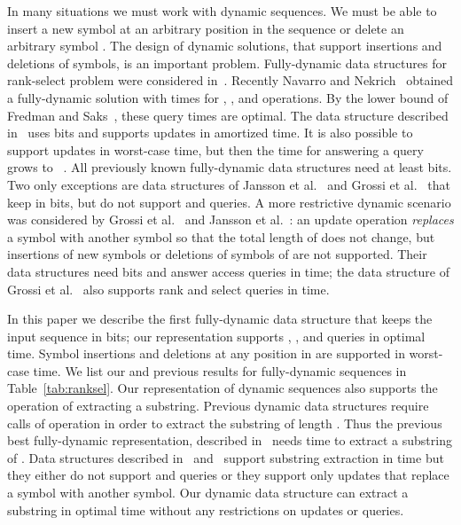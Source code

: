 \documentclass[11pt]{article}\usepackage{fullpage}
\begin{document}
In many situations we must work with dynamic sequences. We must be able to insert a new symbol at an arbitrary 
position  in the sequence or delete an arbitrary symbol .  The design of dynamic solutions, that support insertions and deletions of symbols, is an important problem.  Fully-dynamic data structures for rank-select problem were considered in~\cite{HSS03,CHL04,BB04,MN06,CHLS07,GHSV07,MN08,HSS11}. 
Recently Navarro and Nekrich~\cite{NavarroN13,NavarroN13a} obtained a fully-dynamic solution with  times for , , and  operations. By the lower bound of Fredman and Saks~\cite{FS89}, these query times are optimal.  The data structure described in~\cite{NavarroN13} uses  bits and supports updates in  amortized time. It is also possible to support updates in  worst-case time, but then the time for answering a  query grows to ~\cite{NavarroN13a}. All previously known fully-dynamic data structures need at least  bits. Two only exceptions are data structures of Jansson et al.~\cite{JanssonSS12} and Grossi et al.~\cite{GrossiRRV13} that keep  in  bits, but do not support  and  queries. 
A more restrictive dynamic scenario was considered by Grossi et al.~\cite{GrossiRRV13} and Jansson et al.~\cite{JanssonSS12}: an update operation \emph{replaces} a symbol  with another symbol so that the total length of  does not change, but insertions of new symbols or deletions of symbols of  are not supported.  Their data structures need  bits and answer access queries in  time; the data structure of Grossi et al.~\cite{GrossiRRV13} also supports rank and select queries in  time.

In this paper we describe the first fully-dynamic data structure 
that keeps the input sequence in  bits; our representation supports , , and  queries 
in optimal  time. 
Symbol insertions and deletions at any position in  are supported in  worst-case time.
We list our and previous results for fully-dynamic sequences in Table~\ref{tab:ranksel}. 
Our representation of dynamic sequences also supports the operation of extracting a substring. Previous dynamic data structures 
require  calls of  operation in order to extract the substring of length . Thus the previous best fully-dynamic 
representation, described in~\cite{NavarroN13} needs  time to extract a substring  of . Data structures described in~\cite{GrossiRRV13} and~\cite{JanssonSS12} support substring extraction in  time but they either do not support  and  queries or they support only updates that replace a symbol with another symbol. Our dynamic data structure can extract a substring in optimal  time without any restrictions on updates or queries. 
\end{document}
